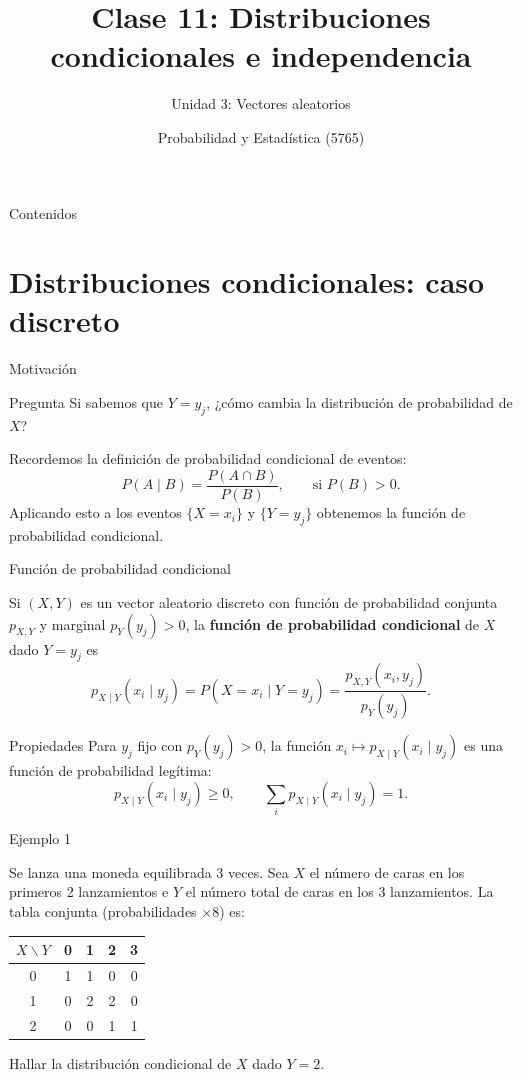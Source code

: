 \documentclass[aspectratio=169,11pt]{beamer}
\title[Prob. y Estadística]{Clase 11: Distribuciones condicionales e independencia}
\subtitle{Unidad 3: Vectores aleatorios}
\institute[UNS]{Universidad Nacional del Sur \\ Departamento de Matemática}
\author{Probabilidad y Estadística (5765)}
\date{}
\begin{document}
\begin{frame}
\titlepage
\end{frame}

\begin{frame}{Contenidos}
\tableofcontents
\end{frame}

\section{Distribuciones condicionales: caso discreto}

\begin{frame}{Motivación}
\begin{block}{Pregunta}
Si sabemos que $Y=y_j$, ¿cómo cambia la distribución de probabilidad de $X$?
\end{block}
\pause
Recordemos la definición de probabilidad condicional de eventos:
\[
P(A\mid B) = \frac{P(A\cap B)}{P(B)}, \qquad \text{si } P(B) > 0.
\]
Aplicando esto a los eventos $\{X=x_i\}$ y $\{Y=y_j\}$ obtenemos la función de probabilidad condicional.
\end{frame}

\begin{frame}{Función de probabilidad condicional}
\begin{definition}
Si $(X,Y)$ es un vector aleatorio discreto con función de probabilidad conjunta $p_{X,Y}$ y marginal $p_Y(y_j) > 0$, la \textbf{función de probabilidad condicional} de $X$ dado $Y=y_j$ es
\[
p_{X\mid Y}(x_i \mid y_j) = P(X=x_i \mid Y=y_j) = \frac{p_{X,Y}(x_i,y_j)}{p_Y(y_j)}.
\]
\end{definition}
\begin{block}{Propiedades}
Para $y_j$ fijo con $p_Y(y_j)>0$, la función $x_i \mapsto p_{X\mid Y}(x_i\mid y_j)$ es una función de probabilidad legítima:
\[
p_{X\mid Y}(x_i\mid y_j) \ge 0, \qquad \sum_i p_{X\mid Y}(x_i \mid y_j) = 1.
\]
\end{block}
\end{frame}

\begin{frame}{Ejemplo 1}
\begin{example}
Se lanza una moneda equilibrada 3 veces. Sea $X$ el número de caras en los primeros 2 lanzamientos e $Y$ el número total de caras en los 3 lanzamientos. La tabla conjunta (probabilidades $\times 8$) es:

\begin{table}[]
\centering
\begin{tabular}{c|cccc}
\toprule
$X\backslash Y$ & 0 & 1 & 2 & 3 \\
\midrule
0 & 1 & 1 & 0 & 0 \\
1 & 0 & 2 & 2 & 0 \\
2 & 0 & 0 & 1 & 1 \\
\bottomrule
\end{tabular}
\end{table}
Hallar la distribución condicional de $X$ dado $Y=2$.
\end{example}
\end{frame}
\end{document}
